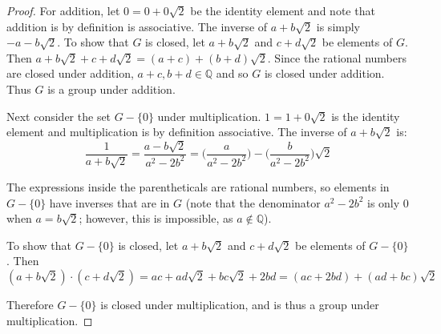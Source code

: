 \documentclass{article}
\begin{document}
\begin{proof}
      For addition, let $0 = 0 + 0\sqrt{2}$ be the identity element and note that addition is by definition is associative. The inverse of $a + b\sqrt{2}$ is simply $-a - b\sqrt{2}$. To show that $G$ is closed, let $a + b\sqrt{2}$ and $c + d\sqrt{2}$ be elements of $G$. Then $a + b\sqrt{2} + c + d\sqrt{2} = (a + c) + (b + d)\sqrt{2}.$ Since the rational numbers are closed under addition, $a + c, b + d \in \mathbb{Q}$ and so $G$ is closed under addition. Thus $G$ is a group under addition.

      Next consider the set $G - \{0\}$ under multiplication. $1 = 1 + 0\sqrt{2}$ is the identity element and multiplication is by definition associative. The inverse of $a + b\sqrt{2}$ is: 
      \begin{equation*}
            \frac{1}{a + b\sqrt{2}} = \frac{a - b\sqrt{2}}{a^2 - 2b^2} = \bigl(\frac{a}{a^2 - 2b^2}\bigr) - \bigl(\frac{b}{a^2 - 2b^2}\bigr)\sqrt{2}
      \end{equation*}

      The expressions inside the parentheticals are rational numbers, so elements in $G - \{0\}$ have inverses that are in $G$ (note that the denominator $a^2 - 2b^2$ is only $0$ when $a = b\sqrt{2}$; however, this is impossible, as $a \notin \mathbb{Q}$).
      
      To show that $G - \{0\}$ is closed, let $a + b\sqrt{2}$ and $c + d\sqrt{2}$ be elements of $G - \{0\}$. Then 
      \begin{equation*}
            (a + b\sqrt{2}) \cdot (c + d\sqrt{2}) = ac + ad\sqrt{2} + bc\sqrt{2} + 2bd = (ac + 2bd) + (ad + bc)\sqrt{2}
      \end{equation*}

      Therefore $G - \{0\}$ is closed under multiplication, and is thus a group under multiplication.

\end{proof}
\end{document}

